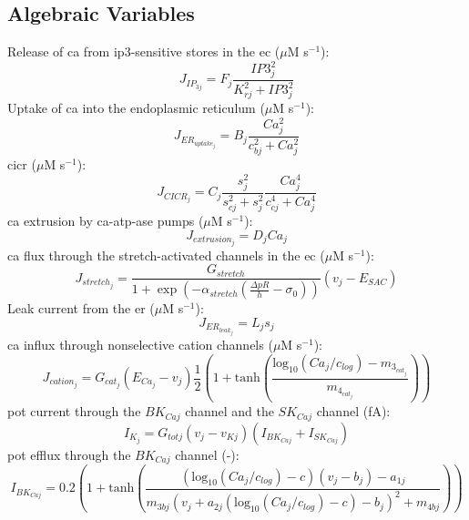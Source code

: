 \documentclass[11pt]{elsarticle}
\newcommand{\mus}{$\mu$M s$^{-1}$\xspace}
\newcommand{\pot}{\gls{pot}\xspace}
\newcommand{\ca}{\gls{ca}\xspace}
\newcommand{\ip}{\gls{ip3}\xspace}
\begin{document}
		\subsection{Algebraic Variables}	
%
Release of \ca from \ip-sensitive stores in the \gls{ec} (\mus):
\begin{equation} \label{eq:JIP3j}
J_{IP_{3j}} = F_{j}\frac{IP3_{j}^{2}}{K_{rj}^{2}+IP3_{j}^{2}}
\end{equation}
%
Uptake of \ca into the endoplasmic reticulum (\mus):
\begin{equation} \label{eq:JERuptakej}
J_{ER_{uptake_{j}}} = B_{j}\frac{Ca_j^{2}}{c_{bj}^{2}+Ca_j^{2}}
\end{equation}
%
\Gls{cicr} (\mus):
\begin{equation} \label{eq:JCICRJ}
J_{CICR_{j}} = C_{j}\frac{s_j^{2}}{s_{cj}^{2}+s_j^{2}}    \frac{Ca_j^{4}}{c_{cj}^{4}+Ca_j^{4}}
\end{equation}
%
\ca extrusion by \ca-\gls{atp}-ase pumps (\mus):
\begin{equation} \label{eq:Jextrusionj}
J_{extrusion_{j}} = D_{j}Ca_j 
\end{equation}
%
\ca flux through the stretch-activated channels in the \gls{ec} (\mus): 
\begin{equation} \label{eq:Jstretchj}
J_{stretch_{j}}= \frac{G_{stretch}}{1+ \exp\left(-\alpha_{stretch}  \left(  \frac{\Delta pR}{h} -\sigma_{0}   \right) \right)}  \left(  v_{j}-E_{SAC}   \right) 
\end{equation}
%
Leak current from the \gls{er} (\mus):
\begin{equation} \label{eq:JERleakj}
J_{ER_{leak_{j}}} = L_{j}s_j
\end{equation}
%
\ca influx through nonselective cation channels (\mus):
\begin{equation} \label{eq:Jcationj}
J_{cation_{j}} = G_{cat_{j}} (E_{Ca_{j}} - v_{j}) \frac{1}{2} \left(   1+ \mathrm{tanh}  \left(  \frac{\mathrm{log}_{10} (Ca_j/c_{log})  - m_{3_{cat_{j}}} }    {m_{4_{cat_{j}}}}   \right)      \right) 
\end{equation}
%
\pot current through the $BK_{Caj}$ channel and the $SK_{Caj}$ channel (fA):
\begin{equation} \label{eq:JKj}
I_{K_{j}} = G_{totj} (v_{j}-v_{Kj}) \left(   I_{BK_{Caj}} + I_{SK_{Caj}} \right) 
\end{equation}
%
\pot efflux through the $BK_{Caj}$ channel (-):
\begin{equation} \label{eq:JBKCAj}
I_{BK_{Caj}} = 0.2 \left(   1+ \mathrm{tanh}   \left(   \frac{   (\mathrm{log}_{10} (Ca_j/c_{log}) - c) (v_{j}-b_{j}) - a_{1j}  }   { m_{3bj} ( v_{j} + a_{2j} (\mathrm{log}_{10} (Ca_j/c_{log}) -c )-b_{j} )^{2} + m_{4bj} }  \right)     \right)  
\end{equation}
\end{document}
